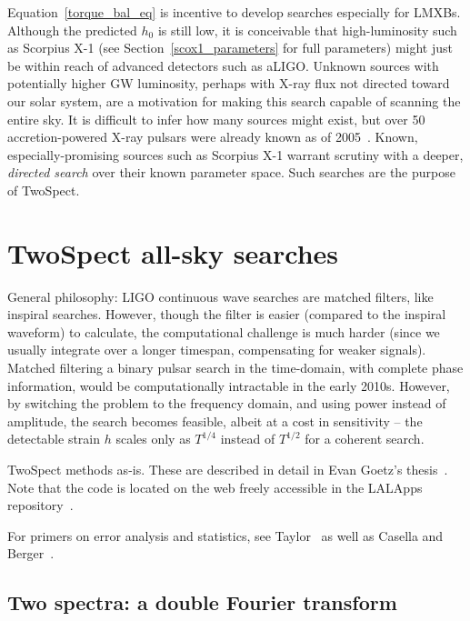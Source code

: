 Equation~\ref{torque_bal_eq} is incentive to develop searches especially for LMXBs.
Although the predicted $h_0$ is still low, it is conceivable that high-luminosity such as Scorpius X-1 (see Section~\ref{scox1_parameters} for full parameters) might just be within reach of advanced detectors such as aLIGO.
Unknown sources with potentially higher GW luminosity, perhaps with X-ray flux not directed toward our solar system, are a motivation for making this search capable of scanning the entire sky.
It is difficult to infer how many sources might exist, but over 50 accretion-powered X-ray pulsars were already known as of 2005~\cite{ManchesterATNF2005}.
Known, especially-promising sources such as Scorpius X-1 warrant scrutiny with a deeper, \textit{directed search} over their known parameter space.
Such searches are the purpose of TwoSpect.

        \section{TwoSpect all-sky searches}
        \label{all-sky}

        General philosophy: LIGO continuous wave searches are matched filters, like inspiral searches. However, though the filter is easier (compared to the inspiral waveform) to calculate, the computational challenge is much harder (since we usually integrate over a longer timespan, compensating for weaker signals). Matched filtering a binary pulsar search in the time-domain, with complete phase information, would be computationally intractable in the early 2010s. However, by switching the problem to the frequency domain, and using power instead of amplitude, the search becomes feasible, albeit at a cost in sensitivity -- the detectable strain $h$ scales only as $T^{1/4}$ instead of $T^{1/2}$ for a coherent search.

            TwoSpect methods as-is. These are described in detail in Evan Goetz's thesis~\cite{GoetzThesis}. Note that the code is located on the web freely accessible in the LALApps repository~\cite{LALAPPSrepo}.

For primers on error analysis and statistics, see Taylor~\cite{taylor} as well as Casella and Berger~\cite{CasellaBerger2001}.

            \subsection{Two spectra: a double Fourier transform}
            \label{two_spectra}

